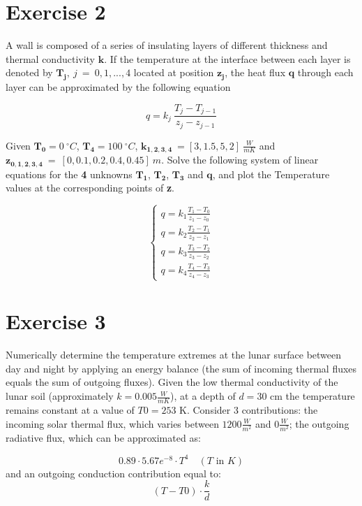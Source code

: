 \documentclass[oneside]{article}
\begin{document}
\section*{Exercise 2}
A wall is composed of a series of insulating layers of different thickness and thermal
conductivity $\mathbf{k}$. If the temperature at the interface between each layer is
denoted by $\mathbf{T_{j}},\:j\:=\:0, 1, ... , 4$ located at position $\mathbf{z_{j}}$,
the heat flux $\mathbf{q}$ through each layer can be approximated by the following
equation

\begin{equation*}
   q = k_{j} \: \frac{T_{j}-T_{j-1}}{z_{j} - z_{j-1}}
\end{equation*}

\noindent Given $\mathbf{T_{0}}=0\: ^{\circ}C$, $\mathbf{T_{4}}=100\: ^{\circ}C$,
$\mathbf{k_{1,2,3,4}}\:=[3,1.5,5,2]\:\frac{W}{mK}$ and
$\mathbf{z_{0,1,2,3,4}}\:=\:[0,0.1,0.2,0.4,0.45]\:m$. Solve the following system of
linear equations for the \textbf{4} unknowns $\mathbf{T_{1}}$, $\mathbf{T_{2}}$,
$\mathbf{T_{3}}$ and $\mathbf{q}$, and plot the Temperature values at the corresponding
points of \textbf{z}.

\begin{equation*}
   \begin{cases}
      q = k_{1}\frac{T_{1}-T_{0}}{z_{1}-z_{0}}\\
      q = k_{2}\frac{T_{2}-T_{1}}{z_{2}-z_{1}}\\
      q = k_{3}\frac{T_{3}-T_{2}}{z_{3}-z_{2}}\\
      q = k_{4}\frac{T_{4}-T_{3}}{z_{4}-z_{3}}
   \end{cases}
\end{equation*}
%
%

\section*{Exercise 3}
Numerically determine the temperature extremes at the lunar surface between day and night
by applying an energy balance (the sum of incoming thermal fluxes equals the sum of
outgoing fluxes). Given the low thermal conductivity of the lunar soil (approximately $k
= 0.005 \frac{W}{mK}$), at a depth of $d = 30$ cm the temperature remains constant at a
value of $T0 = 253$ K. Consider 3 contributions: the incoming solar thermal flux, which
varies between $1200 \frac{W}{m^2}$ and $0 \frac{W}{m^2}$; the outgoing radiative flux,
which can be approximated as:

\begin{equation}
   0.89 \cdot 5.67e^{-8} \cdot T^4 \quad (T \text{ in } K)
\end{equation}
\noindent and an outgoing conduction contribution equal to:
\begin{equation}
   (T - T0) \cdot \frac{k}{d}
\end{equation}
\end{document}
